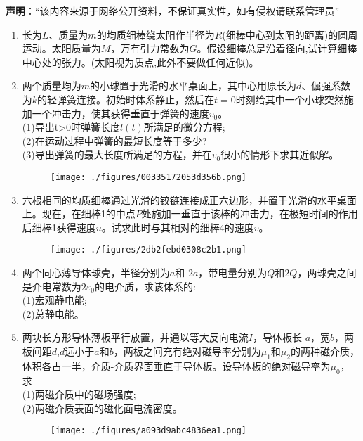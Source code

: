 

\textbf{声明}：“该内容来源于网络公开资料，不保证真实性，如有侵权请联系管理员”

\begin{enumerate}
\item 长为$L$、质量为$m$的均质细棒绕太阳作半径为$R$(细棒中心到太阳的距离)的圆周运动。太阳质量为$M$，万有引力常数为$G$。假设细棒总是沿着径向,试计算细棒中心处的张力。(太阳视为质点,此外不要做任何近似)。
\item 两个质量均为$m$的小球置于光滑的水平桌面上，其中心用原长为$d$、倔强系数为$k$的轻弹簧连接。初始时体系静止，然后在$t=0$时刻给其中一个小球突然施加一个冲击力，使其获得垂直于弹簧的速度$v_0$。\\
(1)导出t>0时弹簧长度$l(t)$所满足的微分方程;\\
(2)在运动过程中弹簧的最短长度等于多少?\\
(3)导出弹簧的最大长度所满足的方程，并在$v_0$很小的情形下求其近似解。
\begin{figure}[ht]
\centering
\texttt{[image: ./figures/00335172053d356b.png]}
\caption{} \label{fig_ZKD16A_1}
\end{figure}
\item 六根相同的均质细棒通过光滑的铰链连接成正六边形，并置于光滑的水平桌面上。现在，在细棒1的中点$P$处施加一垂直于该棒的冲击力，在极短时间的作用后细棒1获得速度$u$。试求此时与其相对的细棒4的速度$v$。
\begin{figure}[ht]
\centering
\texttt{[image: ./figures/2db2febd0308c2b1.png]}
\caption{} \label{fig_ZKD16A_2}
\end{figure}
\item 两个同心薄导体球壳，半径分别为$a$和 $2a$，带电量分别为$Q$和$2Q$，两球壳之间是介电常数为$2\varepsilon_0$的电介质，求该体系的:\\
(1)宏观静电能;\\
(2)总静电能。
\item 两块长方形导体薄板平行放置，并通以等大反向电流$I$，导体板长 $a$，宽$b$，两板间距$d$,$d$远小于$a$和$b$，两板之间充有绝对磁导率分别为$\mu_1$和$\mu_2$的两种磁介质，体积各占一半，介质-介质界面垂直于导体板。设导体板的绝对磁导率为$\mu_0$，求\\
(1)两磁介质中的磁场强度;\\
(2)两磁介质表面的磁化面电流密度。\\
\begin{figure}[ht]
\centering
\texttt{[image: ./figures/a093d9abc4836ea1.png]}

\end{figure}
\end{enumerate}
